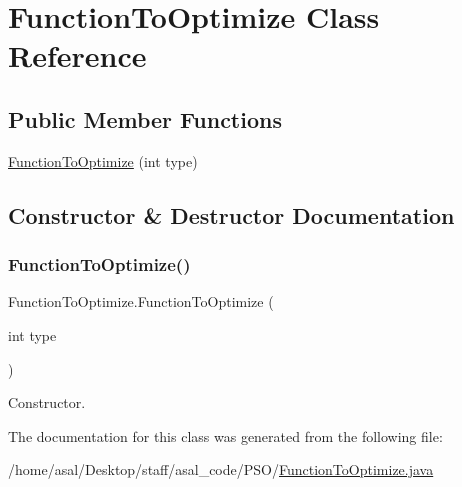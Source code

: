 \hypertarget{class_function_to_optimize}{}\section{Function\+To\+Optimize Class Reference}
\label{class_function_to_optimize}
\subsection*{Public Member Functions}
\begin{DoxyCompactItemize}
\item 
\hyperlink{class_function_to_optimize_ac98c69a430ad4270a84a9f17e48aaf0e}{Function\+To\+Optimize} (int type)
\end{DoxyCompactItemize}


\subsection{Constructor \& Destructor Documentation}
\mbox{\label{class_function_to_optimize_ac98c69a430ad4270a84a9f17e48aaf0e}} 
\subsubsection{\texorpdfstring{Function\+To\+Optimize()}{FunctionToOptimize()}}
{\footnotesize\ttfamily Function\+To\+Optimize.\+Function\+To\+Optimize (\begin{DoxyParamCaption}\item[{int}]{type }\end{DoxyParamCaption})}

Constructor. 

The documentation for this class was generated from the following file\+:\begin{DoxyCompactItemize}
\item 
/home/asal/\+Desktop/staff/asal\+\_\+code/\+P\+S\+O/\hyperlink{_function_to_optimize_8java}{Function\+To\+Optimize.\+java}\end{DoxyCompactItemize}
